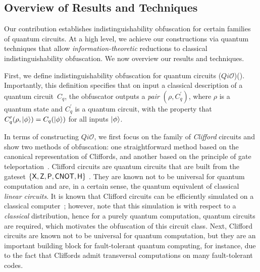 



\subsection{Overview of Results and Techniques}
\label{sec:techniques}

Our contribution establishes indistinguishability obfuscation for certain families of quantum circuits.  At a high level, we achieve our constructions via quantum techniques that allow \emph{information-theoretic} reductions to classical indistinguishability obfuscation. We now overview our results and techniques.

First, we define indistinguishability obfuscation for quantum circuits ($Qi\mathcal{O}$)(). Importantly, this definition specifies that on input a classical description of a quantum circuit~$C_q$, the obfuscator outputs a \emph{pair} $(\rho, C_q^\prime)$, where $\rho$ is a quantum state and $C_q^\prime$ is a quantum circuit, with the property that
$C_q^\prime(\rho,{\lvert}\phi\rangle)=C_{q}({\lvert}\phi\rangle)$ for all inputs ${\lvert}\phi\rangle$.
 
In terms of constructing $Qi\mathcal{O}$, we first focus on the family of \emph{Clifford} circuits and show two methods of obfuscation: one straightforward method based on the canonical representation of Cliffords, and another based on the
principle of gate teleportation~\cite{GC99}.
Clifford circuits are quantum circuits that are built from the gateset $\{{\sf X}, {\sf Z}, {\sf P}, {\sf CNOT}, {\sf H}\}$ . They are known not to be universal for quantum computation and  are, in a certain sense, the quantum equivalent of classical \emph{linear circuits}. It is known that Clifford circuits can be efficiently simulated on a classical computer~\cite{Got98}; however, note that  this simulation is with respect to a \emph{classical} distribution, hence for a purely quantum computation, quantum circuits are required, which motivates the obfuscation of this circuit class. Next,  Clifford circuits are known not to be universal for quantum computation, but they are an important building block for fault-tolerant quantum computing, for instance, due to the fact that Cliffords admit transversal computations on many fault-tolerant codes\cite{BCL+06}.

